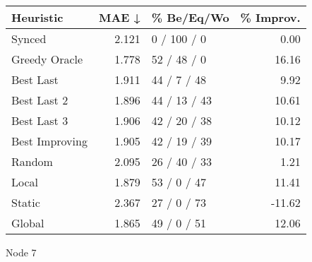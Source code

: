 \begin{tabular}{lrlr}
\toprule
\textbf{Heuristic} & \textbf{MAE ↓} & \textbf{\% Be/Eq/Wo} & \textbf{\% Improv.} \\
\midrule
            Synced &          2.121 &          0 / 100 / 0 &                0.00 \\
     Greedy Oracle &          1.778 &          52 / 48 / 0 &               16.16 \\
         Best Last &          1.911 &          44 / 7 / 48 &                9.92 \\
       Best Last 2 &          1.896 &         44 / 13 / 43 &               10.61 \\
       Best Last 3 &          1.906 &         42 / 20 / 38 &               10.12 \\
    Best Improving &          1.905 &         42 / 19 / 39 &               10.17 \\
            Random &          2.095 &         26 / 40 / 33 &                1.21 \\
             Local &          1.879 &          53 / 0 / 47 &               11.41 \\
            Static &          2.367 &          27 / 0 / 73 &              -11.62 \\
            Global &          1.865 &          49 / 0 / 51 &               12.06 \\
\bottomrule
\end{tabular}
\caption{Node 7}
\label{tab:ds_non_lr05_le2_bs2_7}
